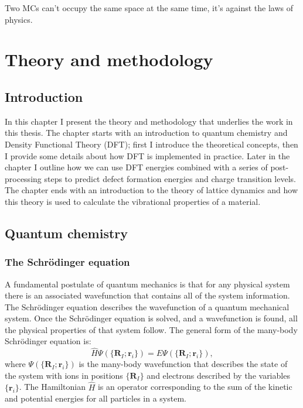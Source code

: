 \begin{savequote}[8cm]
Two MCs can't occupy the same space at the same time,
it's against the laws of physics.
\end{savequote}

\chapter{\label{ch:3-methods}Theory and methodology}

\minitoc



\section{Introduction} 

In this chapter I present the theory and methodology that underlies the work in this thesis. The chapter starts with an introduction to quantum chemistry and Density Functional Theory (DFT); first I introduce the theoretical concepts, then I provide some details about how DFT is implemented in practice. Later in the chapter I outline how we can use DFT energies combined with a series of post-processing steps to predict defect formation energies and charge transition levels. The chapter ends with an introduction to the theory of lattice dynamics and how this theory is used to calculate the vibrational properties of a material. 

\section{Quantum chemistry}

\subsection{The Schr\"{o}dinger equation}

A fundamental postulate of quantum mechanics is that for any physical system there is an associated wavefunction that contains all of the system information.
The Schr\"{o}dinger equation describes the wavefunction of a quantum mechanical system.  Once the Schr\"{o}dinger equation is solved, and a wavefunction is found, all the physical properties of that system follow. 
The general form of the many-body Schr\"{o}dinger equation is:\autocite{Kaxiras2007}
\begin{equation}
\hat{H}\Psi(\{\textbf{R}_I;\textbf{r}_i\}) = E\Psi(\{\textbf{R}_I;\textbf{r}_i\}),
\end{equation}
where $\Psi(\{\textbf{R}_I;\textbf{r}_i\})$ is the many-body wavefunction that describes the state of the system with ions in positions $\{\textbf{R}_I\}$ and electrons described by the variables $\{\textbf{r}_i\}$.
The Hamiltonian $\hat{H}$ is an operator corresponding to the sum of the kinetic and potential energies for all particles in a system. 

